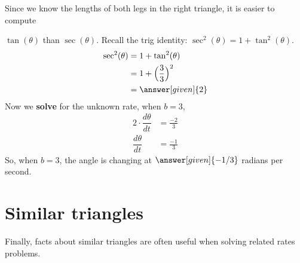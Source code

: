 \documentclass{ximera}
\begin{document}
\begin{example}
\begin{explanation}
\begin{image}
    \end{image}

     Since we know the lengths of both legs in the right triangle, it is easier to compute
    
  $\tan(\theta)$ than  $\sec(\theta)$. Recall the trig identity:  $ \sec^2(\theta)=1+  \tan^2(\theta)$.
    \begin{align*}
    \sec^2(\theta)&= 1+ \tan^2(\theta)\\
      &= 1+\Bigl(\frac{3}{3}\Bigr)^2\\
      &= \answer[given]{2}
    \end{align*}
   Now we \textbf{solve} for the unknown rate, when $b=3$,
    \begin{align*}
      2\cdot \dfrac{d\theta}{dt} &= \frac{-2}{3}\\
    \dfrac{d\theta}{dt}&= \frac{-1}{3}
    \end{align*}
    So, when $b=3$, the angle is changing at $\answer[given]{-1/3}$
    radians per second.
  \end{explanation}
\end{example}



\section{Similar triangles}

Finally, facts about similar triangles are often useful when solving
related rates problems.
\end{document}
